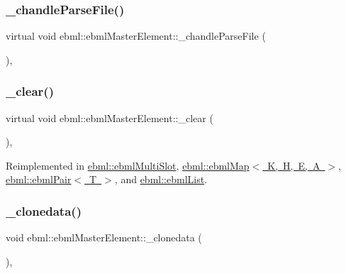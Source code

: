 \subsubsection{\texorpdfstring{\+\_\+chandle\+Parse\+File()}{\_chandleParseFile()}}
{\footnotesize\ttfamily virtual void ebml\+::ebml\+Master\+Element\+::\+\_\+chandle\+Parse\+File (\begin{DoxyParamCaption}\item[{const \mbox{\hyperlink{classebml_1_1parseFile}{parse\+File}} \&}]{ }\end{DoxyParamCaption})\hspace{0.3cm}{\ttfamily [protected]}, {\ttfamily [virtual]}}

\mbox{\label{classebml_1_1ebmlMasterElement_a2fdf9fa1022f06a046fe94e631e266a3}} 
\subsubsection{\texorpdfstring{\+\_\+clear()}{\_clear()}}
{\footnotesize\ttfamily virtual void ebml\+::ebml\+Master\+Element\+::\+\_\+clear (\begin{DoxyParamCaption}{ }\end{DoxyParamCaption})\hspace{0.3cm}{\ttfamily [protected]}, {\ttfamily [virtual]}}



Reimplemented in \mbox{\hyperlink{classebml_1_1ebmlMultiSlot_a0743d6fcdd75068045d53397c97dd2c3}{ebml\+::ebml\+Multi\+Slot}}, \mbox{\hyperlink{classebml_1_1ebmlMap_a3aaf6a51c0e03d5050bdefc527f9776c}{ebml\+::ebml\+Map$<$ K, H, E, A $>$}}, \mbox{\hyperlink{classebml_1_1ebmlPair_a521c8592475793acf050353ddf56031c}{ebml\+::ebml\+Pair$<$ T $>$}}, and \mbox{\hyperlink{classebml_1_1ebmlList_a2e57019d123e9647b47148c6f827cbed}{ebml\+::ebml\+List}}.

\mbox{\label{classebml_1_1ebmlMasterElement_a9bde42f70ab39592c4dccb6bf04904d4}} 
\subsubsection{\texorpdfstring{\+\_\+clonedata()}{\_clonedata()}}
{\footnotesize\ttfamily void ebml\+::ebml\+Master\+Element\+::\+\_\+clonedata (\begin{DoxyParamCaption}\item[{const \mbox{\hyperlink{classebml_1_1ebmlElement}{ebml\+Element}} $\ast$}]{ }\end{DoxyParamCaption})\hspace{0.3cm}{\ttfamily [protected]}, {\ttfamily [virtual]}}



